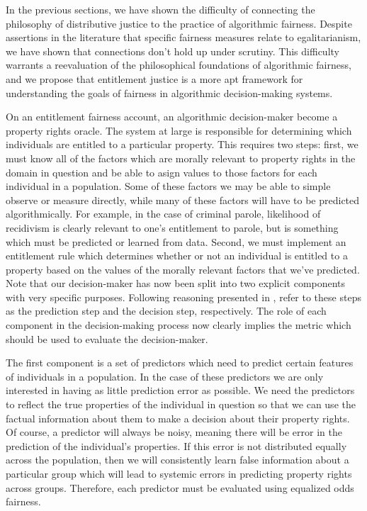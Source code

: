 In the previous sections, we have shown the difficulty of connecting the
philosophy of distributive justice to the practice of algorithmic fairness. 
Despite assertions in the literature that specific fairness measures relate to
egalitarianism, we have shown that connections don't hold up under scrutiny. This
difficulty warrants a reevaluation of the philosophical foundations of
algorithmic fairness, and we propose that entitlement justice is a more apt
framework for understanding the goals of fairness in algorithmic decision-making
systems.

On an entitlement fairness account, an algorithmic decision-maker become a
property rights oracle. The system at large is responsible for determining which
individuals are entitled to a particular property. This requires two steps:
first, we must know all of the factors which are morally relevant to property
rights in the domain in question and be able to asign values to those factors
for each individual in a population. Some of these factors we may be able to 
simple observe or measure directly, while many of these factors will have to be
predicted algorithmically. For example, in the case of criminal parole,
likelihood of recidivism is clearly relevant to one's entitlement to parole, but
is something which must be predicted or learned from data. Second, we must
implement an entitlement rule which determines whether or not an individual is
entitled to a property based on the values of the morally relevant factors that
we've predicted. Note that our decision-maker has now been split into two
explicit components with very specific purposes. Following reasoning presented
in \cite{Kuppler_2021}, refer to these steps as the prediction step and the
decision step, respectively. The role of each component in the decision-making
process now clearly implies the metric which should be used to evaluate the
decision-maker. 

The first component is a set of predictors which need to predict
certain features of individuals in a population. In the case of these predictors
we are only interested in having as little prediction error as possible. We need
the predictors to reflect the true properties of the individual in question so
that we can use the factual information about them to make a decision about
their property rights. Of course, a predictor will always be noisy, meaning
there will be error in the prediction of the individual's properties. If this
error is not distributed equally across the population, then we will
consistently learn false information about a particular group which will lead to
systemic errors in predicting property rights across groups. Therefore, each
predictor must be evaluated using equalized odds fairness.

